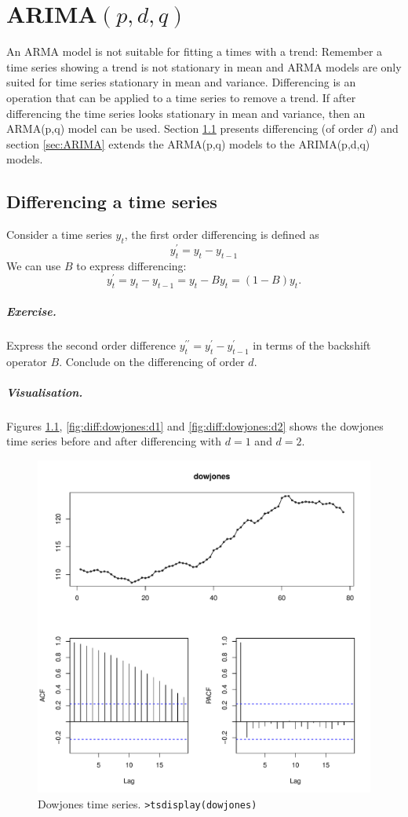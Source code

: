 \documentclass[a4paper,11pt,oneside,onecolumn]{book}
\begin{document}
\chapter{ARIMA$(p,d,q)$}
\label{chp:ARIMA}


An ARMA model is not suitable for fitting  a times with a trend: 
Remember a time series showing a trend is not stationary in mean and ARMA models are only suited for time series stationary in mean and variance.
Differencing is an operation that can be applied to a time series to remove  a trend. If after differencing the time series looks stationary in mean and variance, then an ARMA(p,q) model can be used.  
Section \ref{sec:differencing} presents differencing (of order $d$) and section \ref{sec:ARIMA} extends the ARMA(p,q) models to the ARIMA(p,d,q) models. 

\section{Differencing a time series}
\label{sec:differencing}

Consider a time series $y_t$, the first order differencing is defined as 
$$
y^{\prime}_t = y_t - y_{t-1}
$$
We can use $B$ to express differencing:
\[ y^{\prime}_t = y_t - y_{t-1} = y_t - By_t = (1-B)y_t. \]

\paragraph{Exercise.} Express the second order difference
$y^{\prime\prime}_t = y^{\prime}_t - y^{\prime}_{t-1}$ in terms of the backshift operator
$B$. Conclude on the differencing of order $d$.

\paragraph{Visualisation.}
Figures  \ref{fig:diff:dowjones}, \ref{fig:diff:dowjones:d1} and \ref{fig:diff:dowjones:d2} shows the dowjones time series before and after differencing with $d=1$ and $d=2$. 
\begin{figure}[!h]
\begin{center}
\includegraphics[width=.5\linewidth]{ dowjones.pdf}
\caption{Dowjones time series. \texttt{>tsdisplay(dowjones)}}\label{fig:diff:dowjones}
\end{center}
\end{figure}
\end{document}
